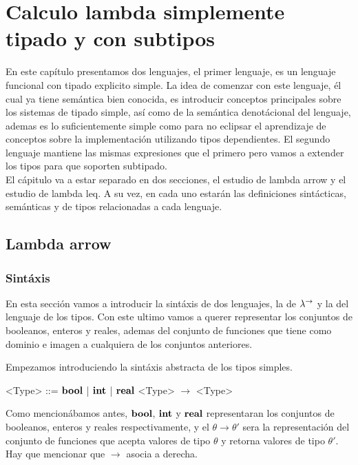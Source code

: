 \chapter{Calculo lambda simplemente tipado y con subtipos}
\label{chap:lambdaarrow}

En este cap\'itulo presentamos dos lenguajes, el primer lenguaje, es un
lenguaje funcional con tipado explicito simple. La idea de comenzar con 
este lenguaje, \'el cual ya tiene sem\'antica bien conocida, es introducir
conceptos principales sobre los sistemas de tipado simple, as\'i
como de la sem\'antica denot\'acional del lenguaje, ademas es lo 
suficientemente simple como para no eclipsar el aprendizaje de 
conceptos sobre la implementaci\'on utilizando tipos dependientes.
El segundo lenguaje mantiene las mismas expresiones que el primero
pero vamos a extender los tipos para que soporten subtipado.\\

El c\'apitulo va a estar separado en dos secciones, el estudio
de lambda arrow y el estudio de lambda leq. A su vez, en cada
uno estar\'an las definiciones sint\'acticas, sem\'anticas y de tipos
relacionadas a cada lenguaje.

\section{Lambda arrow}

\subsection{Sint\'axis}

En esta secci\'on vamos a introducir la sint\'axis de dos lenguajes, 
la de $\lambda^{\rightarrow}$ y la del lenguaje de los tipos.
Con este ultimo vamos a querer representar los conjuntos de booleanos, enteros
y reales, ademas del conjunto de funciones que tiene como dominio
e imagen a cualquiera de los conjuntos anteriores.

Empezamos introduciendo la sint\'axis abstracta de los tipos simples.

\setlength{\grammarindent}{6em}
\begin{grammar}

<Type> ::= $\textbf{bool}$ | $\textbf{int}$ | $\textbf{real}$
\alt <Type> $\rightarrow$ <Type>

\end{grammar}

Como mencion\'abamos antes, $\textbf{bool}$, $\textbf{int}$ y $\textbf{real}$ representaran 
los conjuntos de booleanos, enteros y reales respectivamente, y el
$\theta \rightarrow \theta'$ sera la representaci\'on del conjunto
de funciones que acepta valores de tipo $\theta$ y retorna valores
de tipo $\theta'$. Hay que mencionar que $\rightarrow$ asocia a derecha.\\

